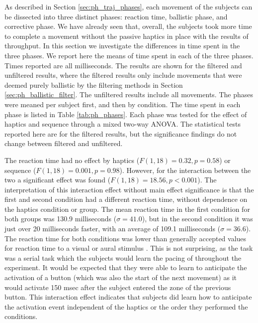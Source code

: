 As described in Section \ref{sec:ph_traj_phases}, each movement of the subjects can be dissected into three distinct phases: reaction time, ballistic phase, and corrective phase.
We have already seen that, overall, the subjects took more time to complete a movement without the passive haptics in place with the results of throughput.
In this section we investigate the differences in time spent in the three phases.
We report here the means of time spent in each of the three phases.
Times reported are all milliseconds.
The results are shown for the filtered and unfiltered results, where the filtered results only include movements that were deemed purely ballistic by the filtering methods in Section \ref{sec:ph_ballistic_filter}.
The unfiltered results include all movements.
The phases were meaned per subject first, and then by condition.
The time spent in each phase is listed in Table \ref{tab:ph_phases}.
Each phase was tested for the effect of haptics and sequence through a mixed two-way ANOVA.
The statistical tests reported here are for the filtered results, but the significance findings do not change between filtered and unfiltered.

The reaction time had no effect by haptics ($F(1,18)=0.32, p=0.58$) or sequence ($F(1,18)=0.001, p=0.98$).
However, for the interaction between the two a significant effect was found ($F(1,18)=18.56, p<0.001$).
The interpretation of this interaction effect without main effect significance is that the first and second condition had a different reaction time, without dependence on the haptics condition or group.
The mean reaction time in the first condition for both groups was 130.9 milliseconds ($\sigma=41.0$), but in the second condition it was just over 20 milliseconds faster, with an average of 109.1 milliseconds ($\sigma=36.6$).
The reaction time for both conditions was lower than generally accepted values for reaction time to a visual or aural stimulus \citep{teichner_recent_1954}.
This is not surprising, as the task was a serial task which the subjects would learn the pacing of throughout the experiment.
It would be expected that they were able to learn to anticipate the activation of a button (which was also the start of the next movement) as it would activate 150 msec after the subject entered the zone of the previous button.
This interaction effect indicates that subjects did learn how to anticipate the activation event independent of the haptics or the order they performed the conditions.

